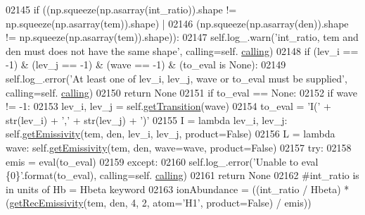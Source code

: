 \begin{DoxyCode}
{{02145         \textcolor{keywordflow}{if} ((np.squeeze(np.asarray(int\_ratio)).shape != np.squeeze(np.asarray(tem)).shape) | 
02146             (np.squeeze(np.asarray(den)).shape != np.squeeze(np.asarray(tem)).shape)):
02147             self.log\_.warn(\textcolor{stringliteral}{'int\_ratio, tem and den must does not have the same shape'}, calling=self.
      \hyperlink{classpyneb_1_1core_1_1pynebcore_1_1_atom_a373b7735acf4f528b54bddf373ad67a1}{calling})
02148         \textcolor{keywordflow}{if} (lev\_i == -1) & (lev\_j == -1) & (wave == -1) & (to\_eval \textcolor{keywordflow}{is} \textcolor{keywordtype}{None}):
02149             self.log\_.error(\textcolor{stringliteral}{'At least one of lev\_i, lev\_j, wave or to\_eval must be supplied'}, calling=self.
      \hyperlink{classpyneb_1_1core_1_1pynebcore_1_1_atom_a373b7735acf4f528b54bddf373ad67a1}{calling})
02150             \textcolor{keywordflow}{return} \textcolor{keywordtype}{None}
02151         \textcolor{keywordflow}{if} to\_eval == \textcolor{keywordtype}{None}:
02152             \textcolor{keywordflow}{if} wave != -1:
02153                 lev\_i, lev\_j = self.\hyperlink{classpyneb_1_1core_1_1pynebcore_1_1_atom_a7c9f17a3d9e841267add92377d9d1ede}{getTransition}(wave)     
02154             to\_eval = \textcolor{stringliteral}{'I('} + str(lev\_i) + \textcolor{stringliteral}{','} + str(lev\_j) + \textcolor{stringliteral}{')'} 
02155         I = \textcolor{keyword}{lambda} lev\_i, lev\_j: self.\hyperlink{classpyneb_1_1core_1_1pynebcore_1_1_atom_aaf4e84a9d5f835e6284bd9302314f775}{getEmissivity}(tem, den, lev\_i, lev\_j, product=\textcolor{keyword}{False})
02156         L = \textcolor{keyword}{lambda} wave: self.\hyperlink{classpyneb_1_1core_1_1pynebcore_1_1_atom_aaf4e84a9d5f835e6284bd9302314f775}{getEmissivity}(tem, den, wave=wave, product=\textcolor{keyword}{False})
02157         \textcolor{keywordflow}{try}:
02158             emis = eval(to\_eval)
02159         \textcolor{keywordflow}{except}:
02160             self.log\_.error(\textcolor{stringliteral}{'Unable to eval \{0\}'}.format(to\_eval), calling=self.
      \hyperlink{classpyneb_1_1core_1_1pynebcore_1_1_atom_a373b7735acf4f528b54bddf373ad67a1}{calling})
02161             \textcolor{keywordflow}{return} \textcolor{keywordtype}{None}
02162         \textcolor{comment}{#int\_ratio is in units of Hb = Hbeta keyword}
02163         ionAbundance = ((int\_ratio / Hbeta) * (\hyperlink{namespacepyneb_1_1core_1_1pynebcore_aba9d4a5306330dd47f8a51455514c017}{getRecEmissivity}(tem, den, 4, 2, atom=\textcolor{stringliteral}{'H1'}, 
      product=\textcolor{keyword}{False}) / emis))
}}
\end{DoxyCode}
